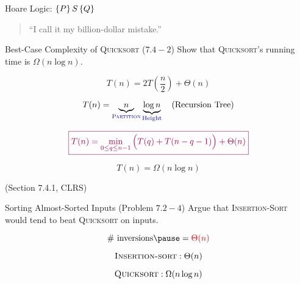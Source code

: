 
\begin{frame}{}
  \centerline{}

  \pause
  \begin{center}
    Hoare Logic: $\left\{P\right\} S \left\{Q\right\}$  \pause \\[4pt]
    \texttt{}
  \end{center}

  \pause
  \begin{quote}
    \centering
    ``I call it my billion-dollar mistake.''
  \end{quote}
\end{frame}

\begin{frame}{}
  \begin{exampleblock}{Best-Case Complexity of \textsc{Quicksort} ($7.4-2$)}
    Show that \textsc{Quicksort}'s  running time is $\Omega(n \log n)$.
  \end{exampleblock}

  \pause
  \[
    T(n) = 2T(\frac{n}{2}) + \Theta(n)
  \]

  \pause
  \[
    T(n) = \underbrace{n}_{\textsc{\textcolor{blue}{Partition}}} \underbrace{\log n}_{\text{\textcolor{blue}{Height}}} \quad \text{(Recursion Tree)}
  \]

  \pause
  \vspace{0.30cm}
  \[
    \textcolor{purple}{\boxed{T(n) = \min_{0 \le q \le n-1} \Big( T(q) + T(n-q-1) \Big) + \Theta(n)}}
  \]

  \pause
  \[
    T(n) = \Omega(n \log n)
  \]

  \pause
  \centerline{ {\footnotesize (Section 7.4.1, CLRS)}}
\end{frame}

\begin{frame}{}
  \begin{exampleblock}{Sorting Almost-Sorted Inputs (Problem $7.2-4$)}
    Argue that \textsc{Insertion-Sort} would tend to beat \textsc{Quicksort} on  inputs.
  \end{exampleblock}

  \pause
  \[
    \# \text{ inversions} \pause = \red{\Theta(n)}
  \]

  \pause
  \[
    \textsc{Insertion-sort}: \Theta(n) 
  \]

  \pause
  \[
    \textsc{Quicksort}: \Omega(n \log n)
  \]
\end{frame}

